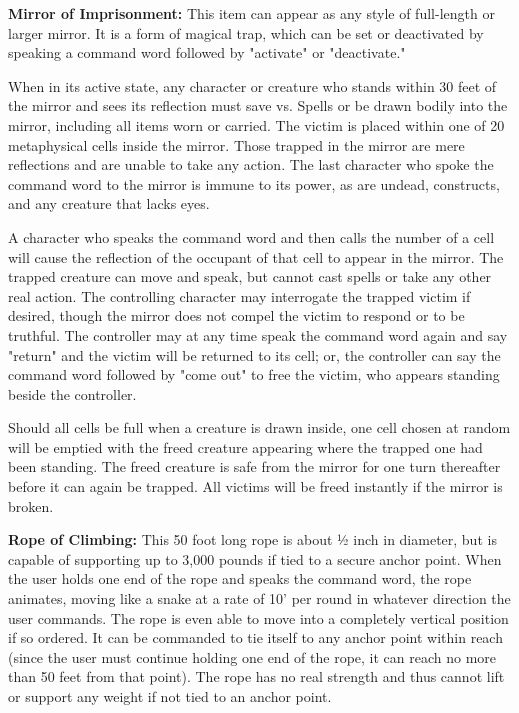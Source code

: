 \documentclass[a4paper,twoside,openany,10pt]{book}
\begin{document}
\begin{multicols}{2}
\textbf{Mirror of Imprisonment:} This item can appear as any style of full-length or larger mirror. It is a form of magical trap, which can be set or deactivated by speaking a command word followed by "activate" or "deactivate."

When in its active state, any character or creature who stands within 30 feet of the mirror and sees its reflection must save vs. Spells or be drawn bodily into the mirror, including all items worn or carried. The victim is placed within one of 20 metaphysical cells inside the mirror. Those trapped in the mirror are mere reflections and are unable to take any action. The last character who spoke the command word to the mirror is immune to its power, as are undead, constructs, and any creature that lacks eyes.

A character who speaks the command word and then calls the number of a cell will cause the reflection of the occupant of that cell to appear in the mirror. The trapped creature can move and speak, but cannot cast spells or take any other real action. The controlling character may interrogate the trapped victim if desired, though the mirror does not compel the victim to respond or to be truthful. The controller may at any time speak the command word again and say "return" and the victim will be returned to its cell; or, the controller can say the command word followed by "come out" to free the victim, who appears standing beside the controller.

Should all cells be full when a creature is drawn inside, one cell chosen at random will be emptied with the freed creature appearing where the trapped one had been standing. The freed creature is safe from the mirror for one turn thereafter before it can again be trapped. All victims will be freed instantly if the mirror is broken.

\textbf{Rope of Climbing:} This 50 foot long rope is about ½ inch in diameter, but is capable of supporting up to 3,000 pounds if tied to a secure anchor point. When the user holds one end of the rope and speaks the command word, the rope animates, moving like a snake at a rate of 10' per round in whatever direction the user commands. The rope is even able to move into a completely vertical position if so ordered. It can be commanded to tie itself to any anchor point within reach (since the user must continue holding one end of the rope, it can reach no more than 50 feet from that point). The rope has no real strength and thus cannot lift or support any weight if not tied to an anchor point.


\end{multicols}
\end{document}
